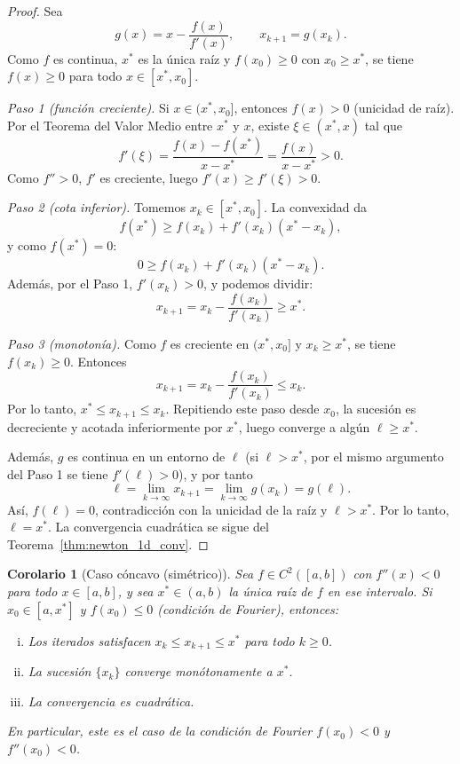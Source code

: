 \documentclass[a4paper,11pt]{report}
\newtheorem{corollary}[theorem]{Corolario}
\begin{document}
\begin{proof}
Sea
\[
g(x)=x-\frac{f(x)}{f'(x)},\qquad x_{k+1}=g(x_k).
\]
Como $f$ es continua, $x^*$ es la única raíz y $f(x_0)\ge0$ con $x_0\ge x^*$,
se tiene $f(x)\ge0$ para todo $x\in[x^*,x_0]$.

\textit{Paso 1 (función creciente).}
Si $x\in(x^*,x_0]$, entonces $f(x)>0$ (unicidad de raíz).
Por el Teorema del Valor Medio entre $x^*$ y $x$, existe $\xi\in(x^*,x)$ tal que
\[
f'(\xi)=\frac{f(x)-f(x^*)}{x-x^*}=\frac{f(x)}{x-x^*}>0.
\]
Como $f''>0$, $f'$ es creciente, luego $f'(x)\ge f'(\xi)>0$.

\textit{Paso 2 (cota inferior).}
Tomemos $x_k\in[x^*,x_0]$. La convexidad da
\[
f(x^*)\ge f(x_k)+f'(x_k)(x^*-x_k),
\]
y como $f(x^*)=0$:
\[
0\ge f(x_k)+f'(x_k)(x^*-x_k).
\]
Además, por el Paso 1, $f'(x_k)>0$, y podemos dividir:
\[
x_{k+1}=x_k-\frac{f(x_k)}{f'(x_k)}\ge x^*.
\]

\textit{Paso 3 (monotonía).}
Como $f$ es creciente en $(x^*,x_0]$ y $x_k\ge x^*$, se tiene $f(x_k)\ge0$.
Entonces
\[
x_{k+1}=x_k-\frac{f(x_k)}{f'(x_k)}\le x_k.
\]
Por lo tanto, $x^*\le x_{k+1}\le x_k$.
Repitiendo este paso desde $x_0$, la sucesión es decreciente y acotada inferiormente por $x^*$,
luego converge a algún $\ell\ge x^*$.

Además, $g$ es continua en un entorno de $\ell$ (si $\ell>x^*$, por el mismo argumento
del Paso 1 se tiene $f'(\ell)>0$), y por tanto
\[
\ell=\lim_{k\to\infty}x_{k+1}=\lim_{k\to\infty}g(x_k)=g(\ell).
\]
Así, $f(\ell)=0$, contradicción con la unicidad de la raíz y $\ell>x^*$.
Por lo tanto, $\ell=x^*$.
La convergencia cuadrática se sigue del Teorema~\ref{thm:newton_1d_conv}.
\end{proof}

\begin{corollary}[Caso cóncavo (simétrico)]\label{cor:newton_concavo}
Sea $f\in C^2([a,b])$ con $f''(x)<0$ para todo $x\in[a,b]$,
y sea $x^*\in(a,b)$ la única raíz de $f$ en ese intervalo.
Si $x_0\in[a,x^*]$ y $f(x_0)\le 0$ (condición de Fourier), entonces:
\begin{enumerate}[(i)]
\item Los iterados satisfacen $x_k\le x_{k+1}\le x^*$ para todo $k\ge 0$.
\item La sucesión $\{x_k\}$ converge monótonamente a $x^*$.
\item La convergencia es cuadrática.
\end{enumerate}
En particular, este es el caso de la condición de Fourier
$f(x_0)<0$ y $f''(x_0)<0$.
\end{corollary}
\end{document}
